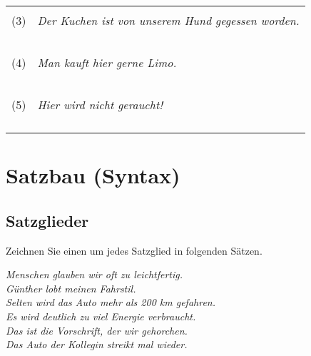 \documentclass[12pt,a4paper,twoside]{article}
\newcommand{\rot}[1]{\textcolor{rot}{#1}}
\newcommand*{\mybox}[1]{\framebox{#1}}
\newcommand{\syntaxaufgabe}{}
\newcommand{\FUBreak}{\clearpage}
\newcommand{\FUZeile}{\hspace{\baselineskip}}
\newcommand{\syntaxaufgabe}{\textbf{\rot{Syntax-Vorlesung}}\ |\ }
\newcommand{\FUBreak}{}
\newcommand{\FUZeile}{}
\begin{document}
\begin{center}
  \begin{tabular}[h]{cp{}}
    & \\
    (3) & \textit{Der Kuchen ist von unserem Hund gegessen worden.} \\
    & \\
    &\\\cline{2-2}
    & \\
    &\\\cline{2-2}
    & \\
    (4) & \textit{Man kauft hier gerne Limo.} \\
    & \\
    &\\\cline{2-2}
    & \\
    &\\\cline{2-2}
    & \\
    (5) & \textit{Hier wird nicht geraucht!} \\
    & \\
    &\\\cline{2-2}
    & \\
    &\\\cline{2-2}
  \end{tabular}
\end{center}

\FUBreak

\section{Satzbau (Syntax)}

\FUZeile

\subsection{\syntaxaufgabe Satzglieder}

Zeichnen Sie einen \mybox{Kasten} um jedes Satzglied in folgenden Sätzen.

\begin{exe}
  \setcounter{xnumi}{0}
  \ex \textit{Menschen glauben wir oft zu leichtfertig.}\\

  \ex \textit{Günther lobt meinen Fahrstil.}\\

  \ex \textit{Selten wird das Auto mehr als 200 km gefahren.}\\

  \ex \textit{Es wird deutlich zu viel Energie verbraucht.}\\

  \ex \textit{Das ist die Vorschrift, der wir gehorchen.}\\

  \ex \textit{Das Auto der Kollegin streikt mal wieder.}
\end{exe}
\end{document}
